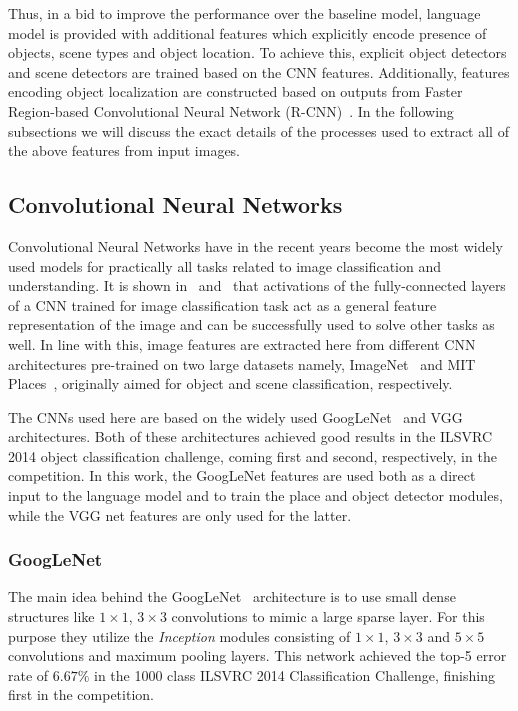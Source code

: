 Thus, in a bid to improve the performance over the baseline model, language
model is provided with additional features which explicitly encode presence
of objects, scene types and object location.
To achieve this, explicit object detectors and scene detectors are trained based
on the CNN features.
Additionally, features encoding object localization are constructed based on
outputs from Faster Region-based Convolutional Neural Network
(R-CNN)~\cite{ren15fasterrcnn}.
In the following subsections we will discuss the exact details of the processes
used to extract all of the above features from input images. 
\subsection{Convolutional Neural Networks}
Convolutional Neural Networks have in the recent years become the most widely
used models for practically all tasks related to image classification and
understanding.
It is shown in~\cite{Donahue2014} and~\cite{Razavian2014CVPR} that activations
of the fully-connected layers of a CNN trained for image classification task act
as a general feature representation of the image and can be successfully used to
solve other tasks as well.
In line with this, image features are extracted here from different CNN
architectures pre-trained on two large datasets namely,
ImageNet~\cite{ImagenetOrig} and MIT Places~\cite{Zhou2014NIPS}, originally
aimed for object and scene classification, respectively.

The CNNs used here are based on the widely used
GoogLeNet~\cite{DBLP:journals/corr/SzegedyLJSRAEVR14} and VGG~\cite{Simonyan14c}
architectures. 
Both of these architectures achieved good results in the ILSVRC 2014 object
classification challenge, coming first and second, respectively, in the
competition.
In this work, the GoogLeNet features are used both as a direct input to the
language model and to train the place and object detector modules, while the VGG
net features are only used for the latter.

\subsubsection{GoogLeNet} 
\label{subsec:gCNN}
The main idea behind the GoogLeNet~\cite{DBLP:journals/corr/SzegedyLJSRAEVR14}
architecture is to use small dense structures like $1\times1$, $3\times3$
convolutions to mimic a large sparse layer.
For this purpose they utilize the \emph{Inception} modules consisting of
$1\times1$, $3\times3$ and $5\times5$ convolutions and maximum pooling layers.
This network achieved the top-5 error rate of $6.67\%$ in the 1000 class ILSVRC
2014 Classification Challenge, finishing first in the competition.

